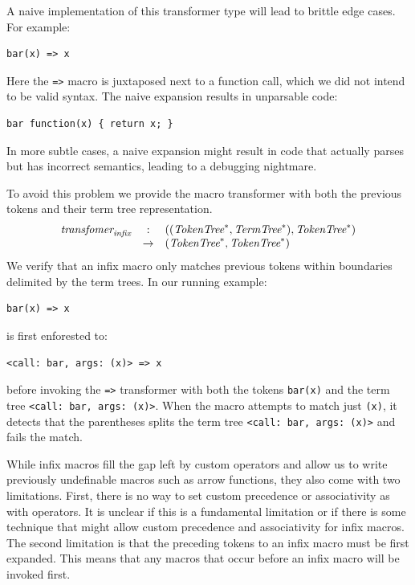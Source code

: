 \documentclass[9pt]{sigplanconf}
\begin{document}
A naive implementation of this transformer type will lead to brittle
edge cases. For example:
\begin{lstlisting}
bar(x) => x
\end{lstlisting}
Here the \verb!=>! macro is juxtaposed next to a function call,
which we did not intend to be valid syntax. The naive expansion results
in unparsable code:
\begin{lstlisting}
bar function(x) { return x; }
\end{lstlisting}

In more subtle cases, a naive expansion might result in code that
actually parses but has incorrect semantics, leading to a
debugging nightmare.

To avoid this problem we provide the macro transformer with both the
previous tokens and their term tree representation.
\[
\begin{array}{rcl}
  \textit{transfomer}_{\textit{infix}} &:& ((\textit{TokenTree}^*, \textit{TermTree}^{*}), \textit{TokenTree}^*) 
  \\
  &\rightarrow& (\textit{TokenTree}^*, \textit{TokenTree}^*)
\end{array}
\]
We verify that an infix macro only
matches previous tokens within boundaries delimited by 
the term trees. In our running example:
\begin{lstlisting}
bar(x) => x
\end{lstlisting}
is first enforested to:
\begin{lstlisting}
<call: bar, args: (x)> => x
\end{lstlisting}
before invoking the \verb!=>! transformer with both the tokens
\verb!bar(x)! and the term tree
\verb!<call: bar, args: (x)>!. When the macro attempts to match
just \verb!(x)!, it detects that the parentheses splits the term
tree \verb!<call: bar, args: (x)>! and fails the match.

While infix macros fill the gap left by custom operators and allow
us to write previously undefinable macros such as arrow functions,
they also come with two limitations. First, there is no way to set
custom precedence or associativity as with operators. It is unclear
if this is a fundamental limitation or if there is some technique that
might allow custom precedence and associativity for infix macros.
The second limitation is that the preceding tokens to an infix macro
must be first expanded. This means that any macros that occur before
an infix macro will be invoked first.
\end{document}
